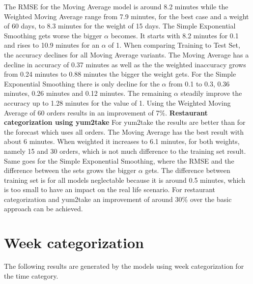 The RMSE for the Moving Average model is around 8.2 minutes while the Weighted Moving Average range from 7.9 minutes, for the best case and a weight of 60 days, to 8.3 minutes for the weight of 15 days. The Simple Exponential Smoothing gets worse the bigger $\alpha$ becomes. It starts with 8.2 minutes for 0.1 and rises to 10.9 minutes for an $\alpha$ of 1. When comparing Training to Test Set, the accuracy declines for all Moving Average variants. The Moving Average has a decline in accuracy of 0.37 minutes as well as the the weighted inaccuracy grows from 0.24 minutes to 0.88 minutes the bigger the weight gets. For the Simple Exponential Smoothing there is only decline for the $\alpha$ from 0.1 to 0.3, 0.36 minutes, 0.26 minutes and 0.12 minutes. The remaining $\alpha$ steadily improve the accuracy up to 1.28 minutes for the value of 1.\newline
Using the Weighted Moving Average of 60 orders results in an improvement of 7\%.
\newline\newline\textbf{Restaurant categorization using yum2take}\newline
For yum2take the results are better than for the forecast which uses all orders. The Moving Average has the best result with about 6 minutes. When weighted it increases to 6.1 minutes, for both weights, namely 15 and 30 orders, which is not much difference to the training set result. Same goes for the Simple Exponential Smoothing, where the RMSE and the difference between the sets grows the bigger $\alpha$ gets. The difference between training set is for all models neglectable because it is around 0.5 minutes, which is too small to have an impact on the real life scenario.\newline
For restaurant categorization and yum2take an improvement of around 30\% over the basic approach can be achieved.
\section{Week categorization}\label{section:Week categorization}
The following results are generated by the models using week categorization for the time category.
